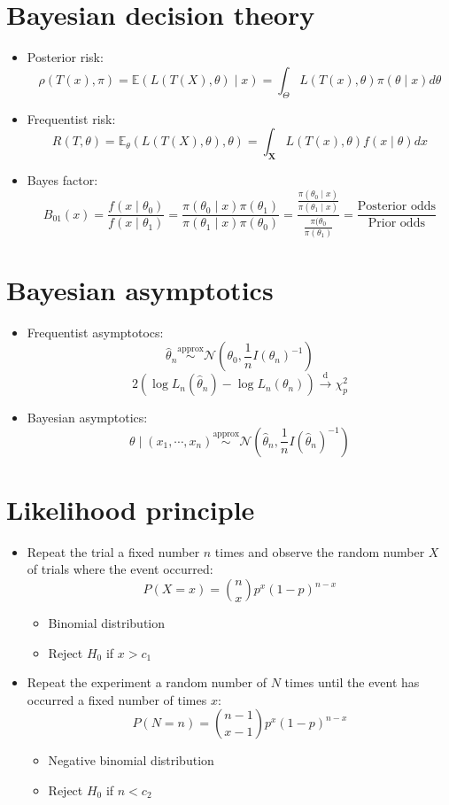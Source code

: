 \documentclass[a4paper]{article}
\begin{document}
\section*{Bayesian decision theory}

\begin{itemize}
    \item Posterior risk:
    \[\rho(T(x),\pi)=\mathbb{E}(L(T(X),\theta)\mid x)=\int_{\Theta}L(T(x),\theta)\pi(\theta\mid x)d\theta \]
    \item Frequentist risk:
    \[R(T,\theta)=\mathbb{E}_{\theta}(L(T(X),\theta),\theta)=\int_{\mathbf{X}}L(T(x),\theta)f(x\mid\theta)dx \]
    \item Bayes factor:
    \[B_{01}(x)=\frac{f(x\mid\theta_0)}{f(x\mid\theta_1)}=\frac{\pi(\theta_0\mid x)\pi(\theta_1)}{\pi(\theta_1\mid x)\pi(\theta_0)}=
    \frac{\frac{\pi(\theta_0\mid x)}{\pi(\theta_1\mid x)}}{\frac{\pi(\theta_0}{\pi(\theta_1)}}=
    \frac{\text{Posterior odds}}{\text{Prior odds}}\]
\end{itemize}

\section*{Bayesian asymptotics}

\begin{itemize}
    \item Frequentist asymptotocs:
    \[\widehat{\theta}_n\overset{\text{approx}}{\sim}\mathcal{N}\left(\theta_0,\frac{1}{n}I(\theta_n)^{-1}\right) \]
    \[2\left(\log L_n(\widehat{\theta}_n)-\log L_n(\theta_n) \right)\overset{\text{d}}{\longrightarrow}\chi_p^2 \]
    \item Bayesian asymptotics:
    \[\theta\mid (x_1,\cdots,x_n)\overset{\text{approx}}{\sim}\mathcal{N}\left(\widehat{\theta}_n,\frac{1}{n}I(\widehat{\theta}_n)^{-1} \right) \]
\end{itemize}

\section*{Likelihood principle}

\begin{itemize}
    \item Repeat the trial a fixed number $n$ times and observe the random number $X$ of trials where the event occurred:
    \[P(X=x)=\binom{n}{x}p^x(1-p)^{n-x} \]
    \begin{itemize}
        \item Binomial distribution
        \item Reject $H_0$ if $x>c_1$
    \end{itemize}
    \item Repeat the experiment a random number of $N$ times until the event has occurred a fixed number of times $x$:
    \[P(N=n)=\binom{n-1}{x-1}p^x(1-p)^{n-x} \]
    \begin{itemize}
        \item Negative binomial distribution
        \item Reject $H_0$ if $n<c_2$
    \end{itemize}
\end{itemize}
\end{document}
